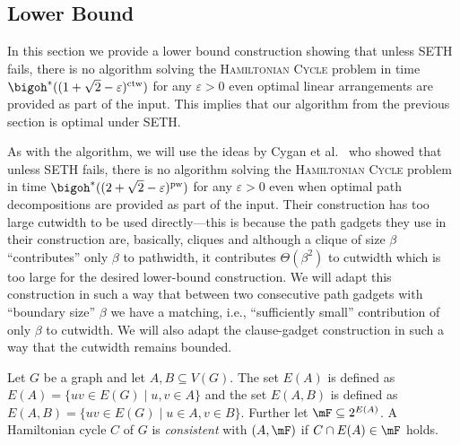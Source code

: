 \documentclass[a4paper,UKenglish,cleveref, autoref, thm-restate]{lipics-v2021}
\begin{document}
  \subsection{Lower Bound}

In this section we provide a lower bound construction showing that unless SETH fails, there is no algorithm solving the \textsc{Hamiltonian Cycle} problem in time $\bigoh^*((1 + \sqrt{2} - \varepsilon)^{\operatorname{ctw}})$ for any $\varepsilon > 0$ even optimal linear arrangements are provided as part of the input.
This implies that our algorithm from the previous section is optimal under SETH.

As with the algorithm, we will use the ideas by Cygan et al.~\cite{DBLP:journals/jacm/CyganKN18} who showed that unless SETH fails, there is no algorithm solving the \textsc{Hamiltonian Cycle} problem in time $\bigoh^*((2 + \sqrt{2} - \varepsilon)^{\operatorname{pw}})$ for any $\varepsilon > 0$ even when optimal path decompositions are provided as part of the input.
Their construction has too large cutwidth to be used directly---this is because the path gadgets they use in their construction are, basically, cliques and although a clique of size $\beta$ ``contributes'' only $\beta$ to pathwidth, it contributes $\Theta(\beta^2)$ to cutwidth which is too large for the desired lower-bound construction.
We will adapt this construction in such a way that between two consecutive path gadgets with ``boundary size'' $\beta$ we have a matching, i.e., ``sufficiently small'' contribution of only $\beta$ to cutwidth. 
We will also adapt the clause-gadget construction in such a way that the cutwidth remains bounded.

\begin{definition}
	Let $G$ be a graph and let $A, B \subseteq V(G)$.
	The set $E(A)$ is defined as $E(A) = \{uv \in E(G) \mid u, v \in A\}$ and the set $E(A, B)$ is defined as $E(A, B) = \{uv \in E(G) \mid u \in A, v \in B\}$.
	Further let $\mF \subseteq 2^{E(A)}$.
	A Hamiltonian cycle $C$ of $G$ is \emph{consistent} with $(A, \mF)$ if $C \cap E(A) \in \mF$ holds.
\end{definition}
\end{document}
